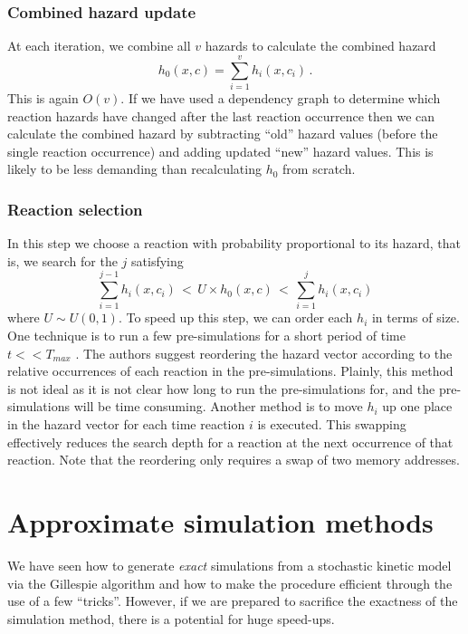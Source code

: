 \documentclass[12pt, DIV12]{scrartcl}
\begin{document}
\subsubsection{Combined hazard update}

At each iteration, we combine all $v$ hazards to calculate the combined hazard
\[
h_{0}(x,c)=\sum_{i=1}^v h_i(x,c_i)\,.
\]
This is again $O(v)$. If we have used a dependency graph to determine which
reaction hazards have changed after the last reaction occurrence then we can
calculate the combined hazard by subtracting ``old'' hazard values (before the
single reaction occurrence) and adding updated ``new'' hazard values. This is
likely to be less demanding than recalculating $h_{0}$ from scratch.


\subsubsection{Reaction selection}

In this step we choose a reaction with probability proportional to its hazard,
that is, we search for the $j$ satisfying
\[
\sum_{i=1}^{j-1}h_{i}(x,c_{i}) \, < \, U\times h_{0}(x,c) \, < \, \sum_{i=1}^{j}h_{i}(x,c_{i})
\]
where $U\sim U(0,1)$. To speed up this step, we can order each $h_{i}$ in terms
of size. One technique is to run a few pre-simulations for a short period of
time $t<<T_{max}$ \citep{Cao04}. The authors suggest reordering the hazard
vector according to the relative occurrences of each reaction in the
pre-simulations. Plainly, this method is not ideal as it is not clear how long
to run the pre-simulations for, and the pre-simulations will be time consuming.
Another method is to move $h_{i}$ up one place in the hazard vector for each
time reaction $i$ is executed\citep{McCollum06}. This swapping effectively
reduces the search depth for a reaction at the next occurrence of that reaction.
Note that the reordering only requires a swap of two memory addresses.

\section{Approximate simulation methods}\label{sec:approx}

We have seen how to generate \emph{exact} simulations from a stochastic kinetic
model via the Gillespie algorithm and how to make the procedure efficient
through the use of a few ``tricks''. However, if we are prepared to sacrifice
the exactness of the simulation method, there is a potential for huge speed-ups.
\end{document}
